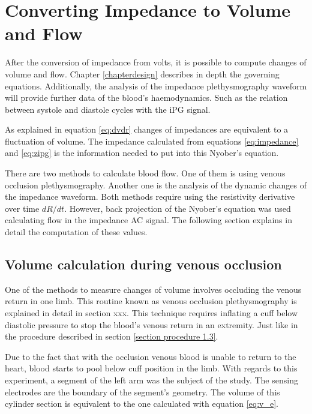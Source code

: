 \section{Converting Impedance to Volume and Flow}
\label{section procedure 3}

After the conversion of impedance from volts, it is possible to compute changes of volume and flow. Chapter \ref{chapterdesign} describes in depth the governing equations. Additionally, the analysis of the impedance plethysmography waveform will provide further data of the blood's haemodynamics. Such as the relation between systole and diastole cycles with the iPG signal.

As explained in equation \ref{eq:dvdr} changes of impedances are equivalent to a fluctuation of volume.  The impedance calculated from equations \ref{eq:impedance} and \ref{eq:zipg} is the information needed to put into this Nyober's equation.

There are two methods to calculate blood flow. One of them is using venous occlusion plethysmography. Another one is the analysis of the dynamic changes of the impedance waveform. Both methods require using the resistivity derivative over time $dR/dt$. However, back projection of the Nyober's equation was used calculating flow in the impedance AC signal. The following section explains in detail the computation of these values.  


\subsection{Volume calculation during venous occlusion}
\label{section.4.3.1}
One of the methods to measure changes of volume involves occluding the venous return in one limb. This routine known as venous occlusion plethysmography is explained in detail in section xxx. This technique requires inflating a cuff below diastolic pressure to stop the blood's venous return in an extremity. Just like in the procedure described in section \ref{section procedure 1.3}. 


Due to the fact that with the occlusion venous blood is unable to return to the heart, blood starts to pool below cuff position in the limb. With regards to this experiment, a segment of the left arm was the subject of the study. The sensing electrodes are the boundary of the segment's geometry. The volume of this cylinder section is equivalent to the one calculated with equation \ref{eq:v_e}. 

